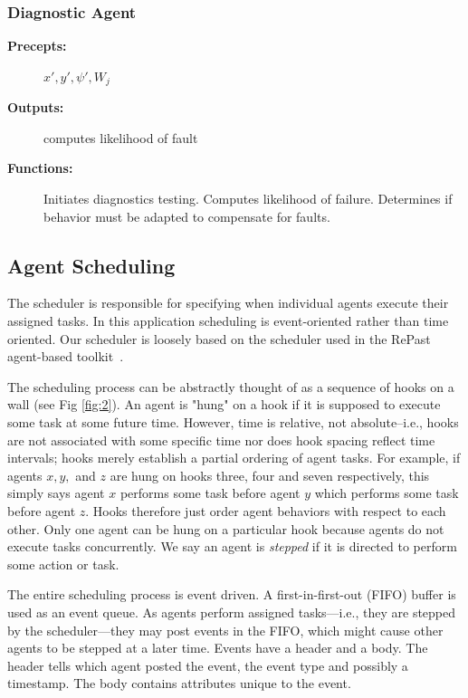 \subsubsection{Diagnostic Agent}
\begin{description}
\item[\textbf{Precepts:}] \qquad $x', y', \psi', W_j$
\item[\textbf{Outputs:}] \qquad computes likelihood of fault
\item[\textbf{Functions:}] \qquad Initiates diagnostics testing. Computes likelihood of failure. Determines if behavior must be adapted to compensate for faults.
\end{description}


\subsection{Agent Scheduling}
\label{subsec-AgentScheduling}
The scheduler is responsible for specifying when individual agents execute their assigned tasks. In this application scheduling is event-oriented rather than time oriented. Our scheduler is loosely based on the scheduler used in the RePast agent-based toolkit~\cite{REPAST}.

The scheduling process can be abstractly thought of as a sequence of hooks on a wall (see Fig \ref{fig:2}). An agent is "hung" on a hook if it is supposed to execute some task at some future time. However, time is relative, not absolute--i.e., hooks are not associated with some specific time nor does hook spacing reflect time intervals; hooks merely establish a partial ordering of agent tasks. For example, if agents $x, y,$ and $z$ are hung on hooks three, four and seven respectively, this simply says agent $x$ performs some task before agent $y$ which performs some task before agent $z$. Hooks therefore just order agent behaviors with respect to each other. Only one agent can be hung on a particular hook because agents do not execute tasks concurrently. We say an agent is \textit{stepped} if it is directed to perform some action or task.
 
The entire scheduling process is event driven. A first-in-first-out (FIFO) buffer is used as an event queue. As agents perform assigned tasks---i.e., they are stepped by the scheduler---they may post events in the FIFO, which might cause other agents to be stepped at a later time. Events have a header and a body. The header tells which agent posted the event, the event type and possibly a timestamp. The body contains attributes unique to the event. 

